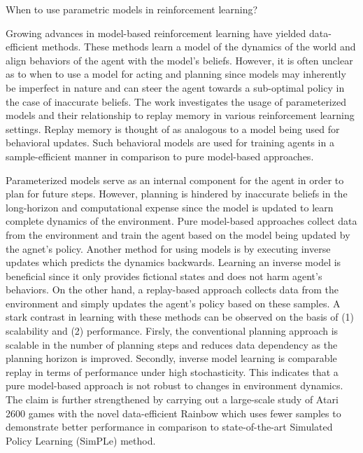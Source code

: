 \documentclass[10pt,letterpaper]{article}
\begin{document}
\begin{center}
  \large{ When to use parametric models in reinforcement learning?}
\end{center}

Growing advances in model-based reinforcement learning have yielded data-efficient methods. These methods learn a model of the dynamics of the world and align behaviors of the agent with the model's beliefs. However, it is often unclear as to when to use a model for acting and planning since models may inherently be imperfect in nature and can steer the agent towards a sub-optimal policy in the case of inaccurate beliefs. The work investigates the usage of parameterized models and their relationship to replay memory in various reinforcement learning settings. Replay memory is thought of as analogous to a model being used for behavioral updates. Such behavioral models are used for training agents in a sample-efficient manner in comparison to pure model-based approaches.

Parameterized models serve as an internal component for the agent in order to plan for future steps. However, planning is hindered by inaccurate beliefs in the long-horizon and computational expense since the model is updated to learn complete dynamics of the environment. Pure model-based approaches collect data from the environment and train the agent based on the model being updated by the agnet's policy. Another method for using models is by executing inverse updates which predicts the dynamics backwards. Learning an inverse model is beneficial since it only provides fictional states and does not harm agent's behaviors. On the other hand, a replay-based approach collects data from the environment and simply updates the agent's policy based on these samples. A stark contrast in learning with these methods can be observed on the basis of (1) scalability and (2) performance. Firsly, the conventional planning approach is scalable in the number of planning steps and reduces data dependency as the planning horizon is improved. Secondly, inverse model learning is comparable replay in terms of performance under high stochasticity. This indicates that a pure model-based approach is not robust to changes in environment dynamics. The claim is further strengthened by carrying out a large-scale study of Atari 2600 games with the novel data-efficient Rainbow which uses fewer samples to demonstrate better performance in comparison to state-of-the-art Simulated Policy Learning (SimPLe) method. 
\end{document}
